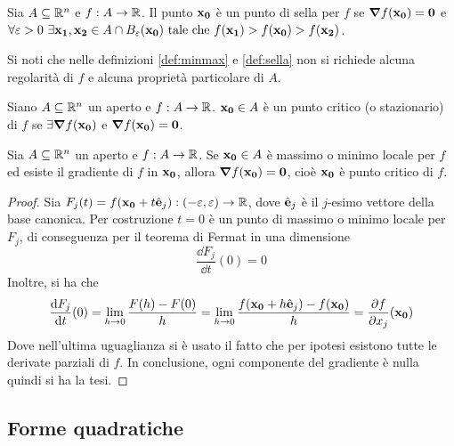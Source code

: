 \begin{definition}
    \label{def:sella}
    Sia $A \subseteq \mathbb{R}^n$ e $f: A \to \mathbb{R}$. Il punto $\vb{x_0}$ è un punto di sella per $f$ se $\grad f(\vb{x_0})=\vb{0}$ e $\forall \varepsilon > 0 \ \exists \vb{x_1}, \vb{x_2} \in A \cap B_\varepsilon(\vb{x_0}) \text{ tale che } f(\vb{x_1}) > f(\vb{x_0}) > f(\vb{x_2})$.
\end{definition}

\begin{remark}
    Si noti che nelle definizioni \ref{def:minmax} e \ref{def:sella} non si richiede alcuna regolarità di $f$ e alcuna proprietà particolare di $A$.
\end{remark}

\begin{definition}
    Siano $A \subseteq \mathbb{R}^n$ un aperto e $f: A\to \mathbb{R}$. $\vb{x_0} \in A$ è un punto critico (o stazionario) di $f$ se $\exists \grad f(\vb{x_0})$ e $\grad f(\vb{x_0})=\vb{0}$.
\end{definition}

\begin{theorem}
    [di Fermat]\label{thm:fermat}
    Sia $A \subseteq \mathbb{R}^n$ un aperto e $f: A \to \mathbb{R}$. Se $\vb{x_0} \in A$ è massimo o minimo locale per $f$ ed esiste il gradiente di $f$ in $\vb{x_0}$, allora $\grad f(\vb{x_0})=\vb{0}$, cioè $\vb{x_0}$ è punto critico di $f$.
\end{theorem}

\begin{proof}
    Sia $F_j(t)=f(\vb{x_0}+t\hat{\vb{e}}_j):(-\varepsilon,\varepsilon)\to\mathbb{R}$, dove $\hat{\vb{e}}_j$ è il $j$-esimo vettore della base canonica. Per costruzione $t=0$ è un punto di massimo o minimo locale per $F_j$, di conseguenza per il teorema di Fermat in una dimensione $$\frac{\dd F_j}{\dd t}(0)=0$$
    Inoltre, si ha che
    \begin{align*}
        \frac{\dd F_j}{\dd t}(0) =\lim_{h\to0}\frac{F(h)-F(0)}{h}= \lim_{h\to 0}\frac{f(\vb{x_0}+h\hat{\vb{e}}_j)-f(\vb{x_0})}{h}=\frac{\partial f}{\partial x_j}(\vb{x_0})
    \end{align*}
    Dove nell'ultima uguaglianza si è usato il fatto che per ipotesi esistono tutte le derivate parziali di $f$. In conclusione, ogni componente del gradiente è nulla quindi si ha la tesi.
\end{proof}

\subsection{Forme quadratiche}

